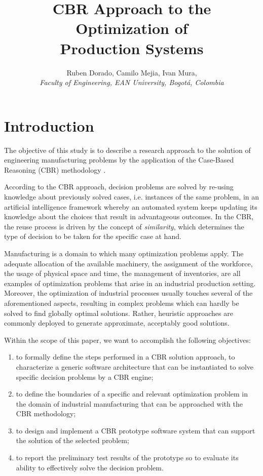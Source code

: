 \documentclass{IEEEtran}
\title{CBR Approach to the Optimization of \\Production Systems}
\author{Ruben Dorado, Camilo Mejia, Ivan Mura, \IEEEmembership{Member,~IEEE} \\
\em Faculty of Engineering, EAN University, Bogot\'a, Colombia}
\date{}
\begin{document}
\maketitle
\begin{abstract}

\end{abstract}

\section{Introduction}
The objective of this study is to describe a research approach to the solution of engineering manufacturing problems by the application of the Case-Based Reasoning (CBR) methodology \cite{Lenz1998, Kolodner2014}.

According to the CBR approach, decision problems are solved by re-using  knowledge about  
previously solved cases, i.e. instances of the same problem, in an artificial intelligence  framework whereby an automated system keeps updating its knowledge  about the choices that result in advantageous outcomes. In the CBR, the reuse process is driven by the concept of {\em similarity}, which determines the type of decision to be taken for the specific case at hand.    

Manufacturing is a domain to which many optimization problems apply. 
The adequate allocation of the available machinery, the assignment of the workforce, the usage of physical space and time, the management of inventories, are all examples of 
optimization problems that arise in an industrial production setting. 
Moreover, the optimization of industrial processes usually touches several of the aforementioned aspects, resulting in complex problems which can hardly be solved to find globally optimal solutions. Rather, heuristic approaches are commonly deployed to generate approximate, acceptably good solutions. 

Within the scope of this paper, we want to accomplish the following objectives:
\begin{enumerate}
\item to formally define the steps performed in a CBR solution approach, to characterize a generic software architecture that can be instantiated to solve specific decision problems by a CBR engine;
\item to define the boundaries of a specific and relevant optimization problem in the domain of industrial manufacturing that can be approached with the CBR methodology;
\item to design and implement a CBR prototype software system that can support the solution of the selected problem;
\item to report the preliminary test results of the prototype so to evaluate its ability to effectively solve the decision problem.  
\end{enumerate}
\end{document}
